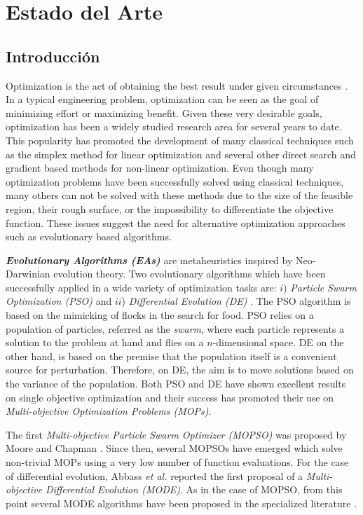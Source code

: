 \chapter{Estado del Arte}

\section{Introducción}
Optimization is the act of obtaining the best result under given circumstances \cite{Rao2009}. In a typical engineering problem, optimization can be seen as the goal of minimizing effort or maximizing benefit. Given these very desirable goals, optimization has been a widely studied research area for several years to date. This popularity has promoted the development of many classical techniques such as the simplex method for linear optimization and several other direct search and gradient based methods for non-linear optimization. Even though many optimization problems have been successfully solved using classical techniques, many others can not be solved with these methods due to the size of the feasible region, their rough surface, or the impossibility to differentiate the objective function. These issues suggest the need for alternative optimization approaches such as evolutionary based algorithms. 


\textbf{\emph{Evolutionary Algorithms (EAs)}} are metaheuristics inspired by Neo-Darwinian evolution theory. Two evolutionary algorithms which have been successfully applied in a wide variety of optimization tasks are: $i$) \emph{Particle Swarm Optimization (PSO)} \cite{Kennedy1995} and $ii$) \emph{Differential Evolution (DE)} \cite{Price1997}. The PSO algorithm is based on the mimicking of flocks in the search for food. PSO relies on a population of particles, referred as the \emph{swarm}, where each particle represents a solution to the problem at hand and flies on a $n$-dimensional space. DE on the other hand, is based on the premise that the population itself is a convenient source for perturbation. Therefore, on DE, the aim is to move solutions based on the variance of the population.  Both PSO and DE have shown excellent results on single objective optimization and their success has promoted their use on \emph{Multi-objective Optimization Problems (MOPs)}.

The first \emph{Multi-objective Particle Swarm Optimizer (MOPSO)} was proposed by Moore and Chapman \cite{Moore99}. Since then, several MOPSOs \cite{Reyes06,Toscano05,Branke06,Coello04} have emerged which solve non-trivial MOPs using a very low number of function evaluations. For the case of differential evolution, Abbass \emph{et al.} \cite{Abbass01} reported the first proposal of a \emph{Multi-objective Differential Evolution (MODE)}. As in the case of MOPSO, from this point several MODE algorithms have been proposed in the specialized literature \cite{Robic05,Santana05,Xue03}.


